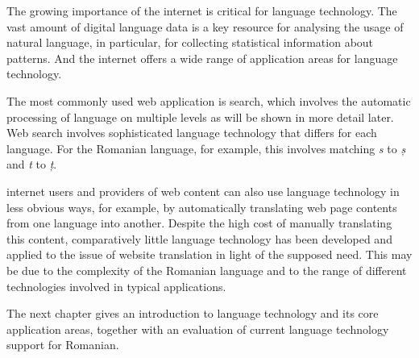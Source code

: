 \begin{multicols}{2}

The growing importance of the internet is critical for language technology. The vast amount of digital language data is a key resource for analysing the usage of natural language, in particular, for collecting statistical information about patterns. And the internet offers a wide range of application areas for language technology. 

The most commonly used web application is search, which involves the automatic processing of language on multiple levels as will be shown in more detail later. Web search involves sophisticated language technology that differs for each language. For the Romanian language, for example, this involves matching \textit{s} to \textit{ș} and \textit{t} to \textit{ț}.

internet users and providers of web content can also use language technology in less obvious ways, for example, by automatically translating web page contents from one language into another. Despite the high cost of manually translating this content, comparatively little language technology has been developed and applied to the issue of website translation in light of the supposed need. This may be due to the complexity of the Romanian language and to the range of different technologies involved in typical applications.

The next chapter gives an introduction to language technology and its core application areas, together with an evaluation of current language technology support for Romanian.

\end{multicols}

\clearpage


